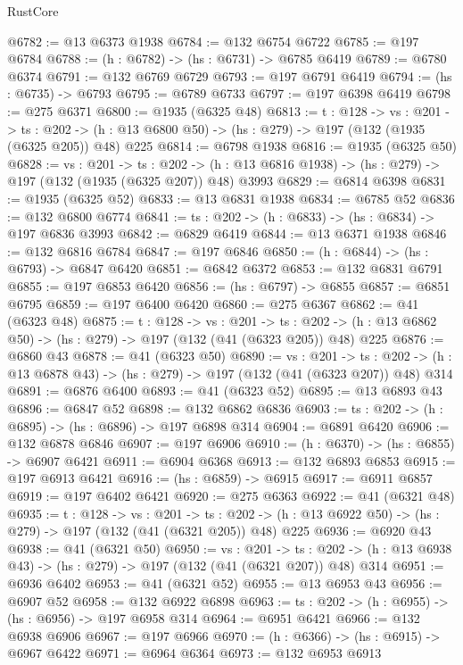 \begin{lexlean}{RustCore}
\begin{coremodule}
@6782 := @13 @6373 @1938
@6784 := @132 @6754 @6722
@6785 := @197 @6784
@6788 := (h : @6782) -> (hs : @6731) -> @6785 @6419
@6789 := @6780 @6374
@6791 := @132 @6769 @6729
@6793 := @197 @6791 @6419
@6794 := (hs : @6735) -> @6793
@6795 := @6789 @6733
@6797 := @197 @6398 @6419
@6798 := @275 @6371
@6800 := @1935 (@6325 @48)
@6813 := {t : @128} ->
  {vs : @201} ->
  {ts : @202} -> (h : @13 @6800 @50) -> (hs : @279) -> @197 (@132 (@1935 (@6325 @205)) @48) @225
@6814 := @6798 @1938
@6816 := @1935 (@6325 @50)
@6828 := {vs : @201} ->
  {ts : @202} -> (h : @13 @6816 @1938) -> (hs : @279) -> @197 (@132 (@1935 (@6325 @207)) @48) @3993
@6829 := @6814 @6398
@6831 := @1935 (@6325 @52)
@6833 := @13 @6831 @1938
@6834 := @6785 @52
@6836 := @132 @6800 @6774
@6841 := {ts : @202} -> (h : @6833) -> (hs : @6834) -> @197 @6836 @3993
@6842 := @6829 @6419
@6844 := @13 @6371 @1938
@6846 := @132 @6816 @6784
@6847 := @197 @6846
@6850 := (h : @6844) -> (hs : @6793) -> @6847 @6420
@6851 := @6842 @6372
@6853 := @132 @6831 @6791
@6855 := @197 @6853 @6420
@6856 := (hs : @6797) -> @6855
@6857 := @6851 @6795
@6859 := @197 @6400 @6420
@6860 := @275 @6367
@6862 := @41 (@6323 @48)
@6875 := {t : @128} ->
  {vs : @201} ->
  {ts : @202} -> (h : @13 @6862 @50) -> (hs : @279) -> @197 (@132 (@41 (@6323 @205)) @48) @225
@6876 := @6860 @43
@6878 := @41 (@6323 @50)
@6890 := {vs : @201} ->
  {ts : @202} -> (h : @13 @6878 @43) -> (hs : @279) -> @197 (@132 (@41 (@6323 @207)) @48) @314
@6891 := @6876 @6400
@6893 := @41 (@6323 @52)
@6895 := @13 @6893 @43
@6896 := @6847 @52
@6898 := @132 @6862 @6836
@6903 := {ts : @202} -> (h : @6895) -> (hs : @6896) -> @197 @6898 @314
@6904 := @6891 @6420
@6906 := @132 @6878 @6846
@6907 := @197 @6906
@6910 := (h : @6370) -> (hs : @6855) -> @6907 @6421
@6911 := @6904 @6368
@6913 := @132 @6893 @6853
@6915 := @197 @6913 @6421
@6916 := (hs : @6859) -> @6915
@6917 := @6911 @6857
@6919 := @197 @6402 @6421
@6920 := @275 @6363
@6922 := @41 (@6321 @48)
@6935 := {t : @128} ->
  {vs : @201} ->
  {ts : @202} -> (h : @13 @6922 @50) -> (hs : @279) -> @197 (@132 (@41 (@6321 @205)) @48) @225
@6936 := @6920 @43
@6938 := @41 (@6321 @50)
@6950 := {vs : @201} ->
  {ts : @202} -> (h : @13 @6938 @43) -> (hs : @279) -> @197 (@132 (@41 (@6321 @207)) @48) @314
@6951 := @6936 @6402
@6953 := @41 (@6321 @52)
@6955 := @13 @6953 @43
@6956 := @6907 @52
@6958 := @132 @6922 @6898
@6963 := {ts : @202} -> (h : @6955) -> (hs : @6956) -> @197 @6958 @314
@6964 := @6951 @6421
@6966 := @132 @6938 @6906
@6967 := @197 @6966
@6970 := (h : @6366) -> (hs : @6915) -> @6967 @6422
@6971 := @6964 @6364
@6973 := @132 @6953 @6913

\end{coremodule}
\end{lexlean}
